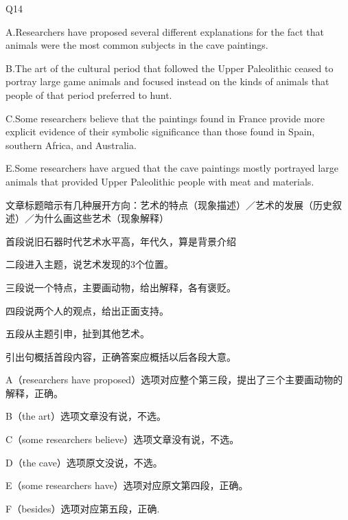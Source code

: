 \begin{blk}
    \begin{qst}
        Q14
    \end{qst}

    \begin{chc}
        A.Researchers have proposed several different explanations for the fact that animals were the most common subjects in the cave paintings.

        B.The art of the cultural period that followed the Upper Paleolithic ceased to portray large game animals and focused instead on the kinds of animals that people of that period preferred to hunt.

        C.Some researchers believe that the paintings found in France provide more explicit evidence of their symbolic significance than those found in Spain, southern Africa, and Australia.

        E.Some researchers have argued that the cave paintings mostly portrayed large animals that provided Upper Paleolithic people with meat and materials.
    \end{chc}

    \begin{nlz}
        文章标题暗示有几种展开方向：艺术的特点（现象描述）／艺术的发展（历史叙述）／为什么画这些艺术（现象解释）

        首段说旧石器时代艺术水平高，年代久，算是背景介绍

        二段进入主题，说艺术发现的3个位置。

        三段说一个特点，主要画动物，给出解释，各有褒贬。

        四段说两个人的观点，给出正面支持。

        五段从主题引申，扯到其他艺术。

        引出句概括首段内容，正确答案应概括以后各段大意。

        A（researchers have proposed）选项对应整个第三段，提出了三个主要画动物的解释，正确。

        B（the art）选项文章没有说，不选。

        C（some researchers believe）选项文章没有说，不选。

        D（the cave）选项原文没说，不选。

        E（some researchers have）选项对应原文第四段，正确。

        F（besides）选项对应第五段，正确.
    \end{nlz}
\end{blk}
